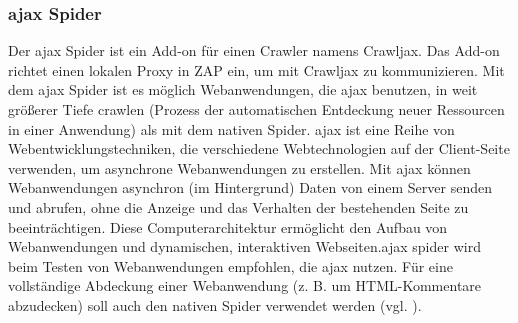 \subsubsection{\acs{ajax} Spider}

Der \acs{ajax} Spider ist ein Add-on für einen Crawler namens Crawljax.
Das Add-on richtet einen lokalen Proxy in ZAP ein, um mit Crawljax
zu kommunizieren. Mit dem \acs{ajax} Spider ist es möglich Webanwendungen,
die  \acs{ajax} benutzen, in weit größerer Tiefe \Gls{crawlen} (Prozess der
automatischen Entdeckung neuer Ressourcen in einer Anwendung) als mit
dem nativen Spider. \acs{ajax} ist eine Reihe von Webentwicklungstechniken, die
verschiedene Webtechnologien auf der Client-Seite verwenden, um
asynchrone Webanwendungen zu erstellen. Mit \acs{ajax} können Webanwendungen
asynchron (im Hintergrund) Daten von einem Server senden und abrufen,
ohne die Anzeige und das Verhalten der bestehenden Seite zu beeinträchtigen.
Diese Computerarchitektur ermöglicht den Aufbau von Webanwendungen und
dynamischen, interaktiven Webseiten.\acs{ajax} spider wird beim Testen von Webanwendungen
empfohlen, die \acs{ajax} nutzen. Für eine vollständige Abdeckung einer
Webanwendung (z. B. um HTML-Kommentare abzudecken) soll auch den
nativen Spider verwendet werden (vgl. \cite{ajax}).
